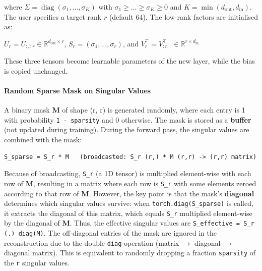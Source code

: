 where $\Sigma = \operatorname{diag}(\sigma_1, \dots, \sigma_K)$ with $\sigma_1 \ge \dots \ge \sigma_K \ge 0$ and $K = \min(d_{\text{out}}, d_{\text{in}})$. The user specifies a target rank $r$ (default 64). The low-rank factors are initialised as:

$U_r = U_{:, :r} \in \mathbb{R}^{d_{\text{out}} \times r}$, $S_r = (\sigma_1, \dots, \sigma_r)$, and $V_r^\top = V^\top_{:r, :} \in \mathbb{R}^{r \times d_{\text{in}}}$


These three tensors become learnable parameters of the new layer, while the bias is copied unchanged.

\paragraph{Random Sparse Mask on Singular Values}

A binary mask \textbf{M} of shape (r, r) is generated randomly, where each entry is 1 with probability \texttt{1 - sparsity} and 0 otherwise. The mask is stored as a \textbf{buffer} (not updated during training). During the forward pass, the singular values are combined with the mask:

\vspace{0.5em}
\begin{mdframed}[backgroundcolor=codebg, linecolor=codeframe, linewidth=1pt, roundcorner=4pt, innerleftmargin=2pt, innerrightmargin=5pt, innertopmargin=5pt, innerbottommargin=5pt]
\begin{lstlisting}
S_sparse = S_r * M   (broadcasted: S_r (r,) * M (r,r) -> (r,r) matrix)
\end{lstlisting}
\end{mdframed}
\vspace{0.5em}

Because of broadcasting, \texttt{S\_r} (a 1D tensor) is multiplied element-wise with each row of \textbf{M}, resulting in a matrix where each row is \texttt{S\_r} with some elements zeroed according to that row of \textbf{M}. However, the key point is that the mask's \textbf{diagonal} determines which singular values survive: when \texttt{torch.diag(S\_sparse)} is called, it extracts the diagonal of this matrix, which equals \texttt{S\_r} multiplied element-wise by the diagonal of \textbf{M}. Thus, the effective singular values are \texttt{S\_effective = S\_r (.) diag(M)}. The off-diagonal entries of the mask are ignored in the reconstruction due to the double \texttt{diag} operation (matrix $\rightarrow$ diagonal $\rightarrow$ diagonal matrix). This is equivalent to randomly dropping a fraction \texttt{sparsity} of the \texttt{r} singular values.

